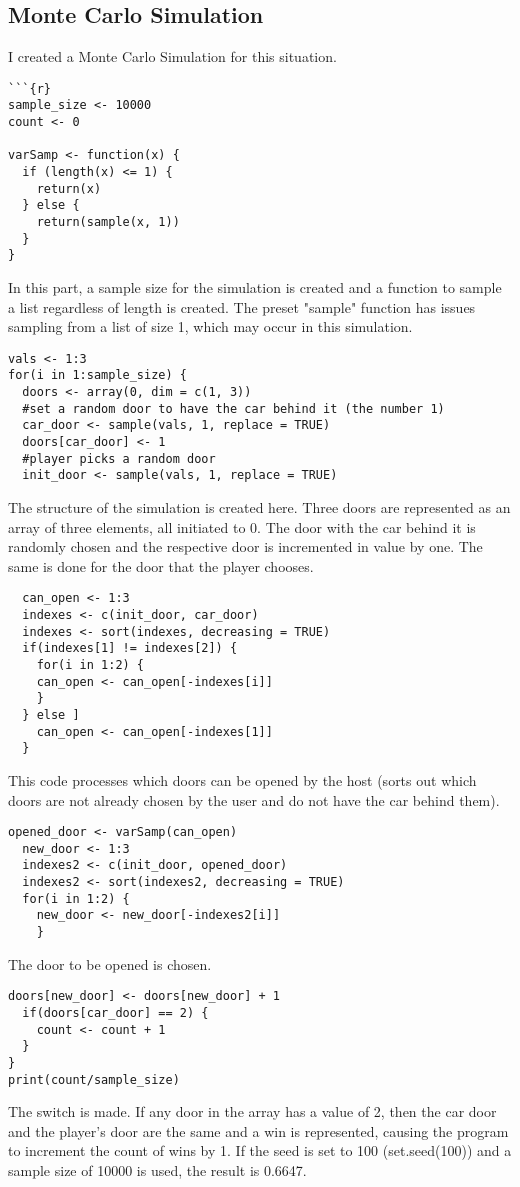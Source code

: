\documentclass{article}
\begin{document}
\subsection{Monte Carlo Simulation}
I created a Monte Carlo Simulation for this situation.
\begin{lstlisting}
```{r}
sample_size <- 10000
count <- 0

varSamp <- function(x) {
  if (length(x) <= 1) {
    return(x)
  } else {
    return(sample(x, 1))
  }
}
\end{lstlisting}
In this part, a sample size for the simulation is created and a function to sample a list regardless of length is created. The preset "sample" function has issues sampling from a list of size 1, which may occur in this simulation.
\begin{lstlisting}
vals <- 1:3
for(i in 1:sample_size) {
  doors <- array(0, dim = c(1, 3))
  #set a random door to have the car behind it (the number 1)
  car_door <- sample(vals, 1, replace = TRUE)
  doors[car_door] <- 1
  #player picks a random door
  init_door <- sample(vals, 1, replace = TRUE)
\end{lstlisting}
The structure of the simulation is created here. Three doors are represented as an array of three elements, all initiated to 0. The door with the car behind it is randomly chosen and the respective door is incremented in value by one. The same is done for the door that the player chooses.
\begin{lstlisting}
  can_open <- 1:3
  indexes <- c(init_door, car_door)
  indexes <- sort(indexes, decreasing = TRUE)
  if(indexes[1] != indexes[2]) {
    for(i in 1:2) {
    can_open <- can_open[-indexes[i]]
    }
  } else ]
    can_open <- can_open[-indexes[1]]
  }
\end{lstlisting}
This code processes which doors can be opened by the host (sorts out which doors are not already chosen by the user and do not have the car behind them).
\begin{lstlisting}
opened_door <- varSamp(can_open)
  new_door <- 1:3
  indexes2 <- c(init_door, opened_door)
  indexes2 <- sort(indexes2, decreasing = TRUE)
  for(i in 1:2) {
    new_door <- new_door[-indexes2[i]]
    }
\end{lstlisting}
The door to be opened is chosen.
\begin{lstlisting}
doors[new_door] <- doors[new_door] + 1
  if(doors[car_door] == 2) {
    count <- count + 1
  }
}
print(count/sample_size)
\end{lstlisting}
The switch is made. If any door in the array has a value of 2, then the car door and the player's door are the same and a win is represented, causing the program to increment the count of wins by 1.
If the seed is set to 100 (set.seed(100)) and a sample size of 10000 is used, the result is 0.6647.
\end{document}
